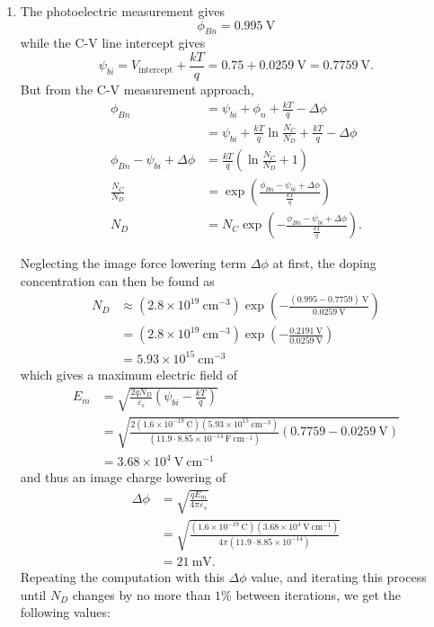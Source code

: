 \documentclass{article}
\begin{document}
\begin{enumerate}
\item{
The photoelectric measurement gives
$$
\phi_{Bn} = 0.995 ~\mathrm{V}
$$
while the C-V line intercept gives
$$
\psi_{bi} = V_{\mathrm{intercept}} + \frac{kT}{q} =  0.75 + 0.0259  ~\mathrm{V} = 0.7759 ~\mathrm{V}.
$$
But from the C-V measurement approach,
\begin{align*}
\phi_{Bn} &= \psi_{bi} + \phi_n + \frac{kT}{q} - \Delta \phi \\
          &= \psi_{bi} 
           + \frac{kT}{q}\ln\frac{N_C}{N_D}
           + \frac{kT}{q}
           - \Delta \phi \\
\phi_{Bn} - \psi_{bi} + \Delta \phi &= \frac{kT}{q}\left(\ln\frac{N_C}{N_D} + 1\right) \\
\frac{N_C}{N_D} &= \exp\left(\frac{\phi_{Bn} - \psi_{bi} + \Delta \phi}
                                  {\frac{kT}{q}}\right) \\
N_D &= N_C \exp\left(-\frac{\phi_{Bn} - \psi_{bi} + \Delta \phi}{\frac{kT}{q}}\right).
\end{align*}

Neglecting the image force lowering term $\Delta \phi$ at first,
the doping concentration can then be found as
\begin{align*} 
N_D &\approx (2.8 \times 10^{19} ~\mathrm{cm}^{-3}) 
             \exp\left(-\frac{(0.995 - 0.7759) ~\mathrm{V}}{0.0259 ~\mathrm{V}}\right) \\
    &=       (2.8 \times 10^{19} ~\mathrm{cm}^{-3}) 
             \exp\left(-\frac{0.2191 ~\mathrm{V}}{0.0259 ~\mathrm{V}}\right) \\
    &= 5.93 \times 10^{15} ~\mathrm{cm}^{-3}
\end{align*}
which gives a maximum electric field of
\begin{align*}
E_m &= \sqrt{\frac{2 q N_D}{\varepsilon_s}\left(\psi_{bi} - \frac{kT}{q}\right)} \\
    &= \sqrt{\frac{2 (1.6 \times 10^{-19} ~\mathrm{C})
                     (5.93 \times 10^{15} ~\mathrm{cm}^{-3})}
                  {(11.9 \cdot 8.85 \times 10^{-14} ~\mathrm{F}~\mathrm{cm}^{-1})}
             \left(0.7759 - 0.0259 ~\mathrm{V}\right)} \\
    &= 3.68 \times 10^{4} ~\mathrm{V}~\mathrm{cm}^{-1}
\end{align*}
and thus an image charge lowering of
\begin{align*}
\Delta \phi &= \sqrt{\frac{q E_m}{4 \pi \varepsilon_s}} \\
            &= \sqrt{\frac{(1.6 \times 10^{-19} ~\mathrm{C})
                           (3.68 \times 10^{4} ~\mathrm{V}~\mathrm{cm}^{-1})}
                    {4\pi(11.9 \cdot 8.85 \times 10^{-14})}} \\
            &= 21 ~\mathrm{mV}. 
\end{align*}
Repeating the computation with this $\Delta \phi$ value, and iterating this
process until $N_D$ changes by no more than $1\%$ between iterations,
we get the following values:

}
\end{enumerate}
\end{document}
